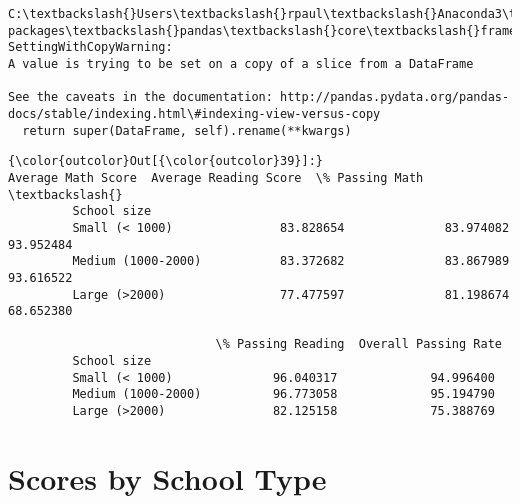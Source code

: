 \documentclass[11pt]{article}
\begin{document}
    \begin{Verbatim}[commandchars=\\\{\}]
C:\textbackslash{}Users\textbackslash{}rpaul\textbackslash{}Anaconda3\textbackslash{}lib\textbackslash{}site-packages\textbackslash{}pandas\textbackslash{}core\textbackslash{}frame.py:3027: SettingWithCopyWarning: 
A value is trying to be set on a copy of a slice from a DataFrame

See the caveats in the documentation: http://pandas.pydata.org/pandas-docs/stable/indexing.html\#indexing-view-versus-copy
  return super(DataFrame, self).rename(**kwargs)

    \end{Verbatim}

\begin{Verbatim}[commandchars=\\\{\}]
{\color{outcolor}Out[{\color{outcolor}39}]:}                     Average Math Score  Average Reading Score  \% Passing Math  \textbackslash{}
         School size                                                                     
         Small (< 1000)               83.828654              83.974082       93.952484   
         Medium (1000-2000)           83.372682              83.867989       93.616522   
         Large (>2000)                77.477597              81.198674       68.652380   
         
                             \% Passing Reading  Overall Passing Rate  
         School size                                                  
         Small (< 1000)              96.040317             94.996400  
         Medium (1000-2000)          96.773058             95.194790  
         Large (>2000)               82.125158             75.388769  
\end{Verbatim}
            
    \section{Scores by School Type}\label{scores-by-school-type}
\end{document}

